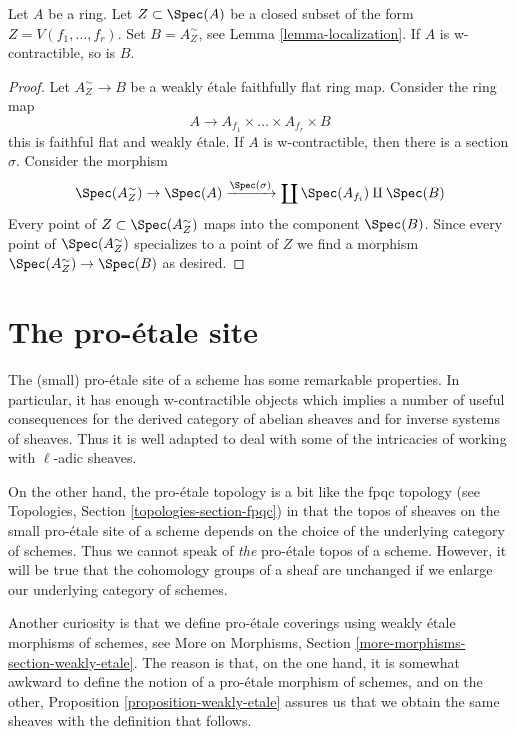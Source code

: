 \begin{lemma}
\label{lemma-localization-w-contractible}
Let $A$ be a ring. Let $Z \subset \Spec(A)$ be a closed subset
of the form $Z = V(f_1, \ldots, f_r)$. Set $B = A_Z^\sim$, see
Lemma \ref{lemma-localization}. If $A$ is w-contractible, so is $B$.
\end{lemma}

\begin{proof}
Let $A_Z^\sim \to B$ be a weakly \'etale faithfully flat ring map.
Consider the ring map
$$
A \longrightarrow A_{f_1} \times \ldots \times A_{f_r} \times B
$$
this is faithful flat and weakly \'etale. If $A$ is w-contractible,
then there is a section $\sigma$. Consider the morphism
$$
\Spec(A_Z^\sim) \to \Spec(A) \xrightarrow{\Spec(\sigma)}
\coprod \Spec(A_{f_i}) \amalg \Spec(B)
$$
Every point of $Z \subset \Spec(A_Z^\sim)$ maps into the component
$\Spec(B)$. Since every point of $\Spec(A_Z^\sim)$ specializes to a
point of $Z$ we find a morphism $\Spec(A_Z^\sim) \to \Spec(B)$
as desired.
\end{proof}






\section{The pro-\'etale site}
\label{section-proetale}

\noindent
The (small) pro-\'etale site of a scheme has some remarkable properties.
In particular, it has enough w-contractible objects which implies
a number of useful consequences for the derived category
of abelian sheaves and for inverse systems of sheaves. Thus it is
well adapted to deal with some of the intricacies of working
with $\ell$-adic sheaves.

\medskip\noindent
On the other hand, the pro-\'etale topology is a bit like
the fpqc topology (see Topologies, Section \ref{topologies-section-fpqc})
in that the topos of sheaves on the small pro-\'etale site of a scheme
depends on the choice of the underlying category of schemes. Thus we cannot
speak of {\it the} pro-\'etale topos of a scheme. However, it will be
true that the cohomology groups of a sheaf are unchanged if we enlarge
our underlying category of schemes.

\medskip\noindent
Another curiosity is that we define pro-\'etale coverings using weakly
\'etale morphisms of schemes, see
More on Morphisms, Section \ref{more-morphisms-section-weakly-etale}.
The reason is that, on the one hand, it is somewhat awkward to define
the notion of a pro-\'etale morphism of schemes, and on the other,
Proposition \ref{proposition-weakly-etale}
assures us that we obtain the same sheaves with the
definition that follows.

